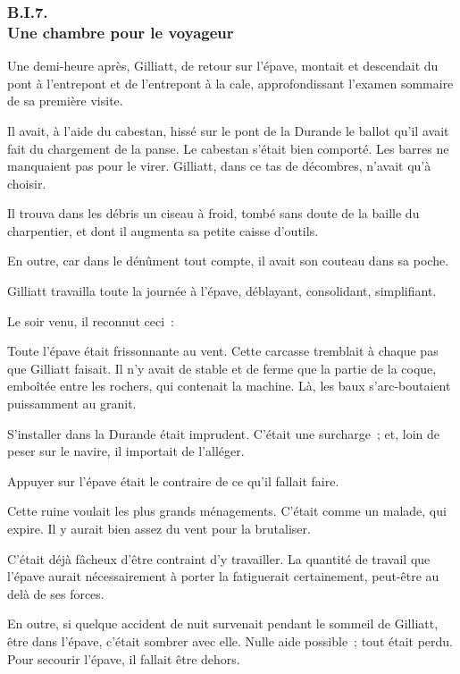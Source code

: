 \documentclass[french,twoside]{book} %
\begin{document}
 \subsubsection[{B.I.7. Une chambre pour le voyageur}]{B.I.7. \\
Une chambre pour le voyageur}
\noindent Une demi-heure après, Gilliatt, de retour sur l’épave, montait et descendait du pont à l’entrepont et de l’entrepont à la cale, approfondissant l’examen sommaire de sa première visite.\par
Il avait, à l’aide du cabestan, hissé sur le pont de la Durande le ballot qu’il avait fait du chargement de la panse. Le cabestan s’était bien comporté. Les barres ne manquaient pas pour le virer. Gilliatt, dans ce tas de décombres, n’avait qu’à choisir.\par
Il trouva dans les débris un ciseau à froid, tombé sans doute de la baille du charpentier, et dont il augmenta sa petite caisse d’outils.\par
En outre, car dans le dénûment tout compte, il avait son couteau dans sa poche.\par
Gilliatt travailla toute la journée à l’épave, déblayant, consolidant, simplifiant.\par
Le soir venu, il reconnut ceci :\par
Toute l’épave était frissonnante au vent. Cette  carcasse tremblait à chaque pas que Gilliatt faisait. Il n’y avait de stable et de ferme que la partie de la coque, emboîtée entre les rochers, qui contenait la machine. Là, les baux s’arc-boutaient puissamment au granit.\par
S’installer dans la Durande était imprudent. C’était une surcharge ; et, loin de peser sur le navire, il importait de l’alléger.\par
Appuyer sur l’épave était le contraire de ce qu’il fallait faire.\par
Cette ruine voulait les plus grands ménagements. C’était comme un malade, qui expire. Il y aurait bien assez du vent pour la brutaliser.\par
C’était déjà fâcheux d’être contraint d’y travailler. La quantité de travail que l’épave aurait nécessairement à porter la fatiguerait certainement, peut-être au delà de ses forces.\par
En outre, si quelque accident de nuit survenait pendant le sommeil de Gilliatt, être dans l’épave, c’était sombrer avec elle. Nulle aide possible ; tout était perdu. Pour secourir l’épave, il fallait être dehors.\par
\end{document}
